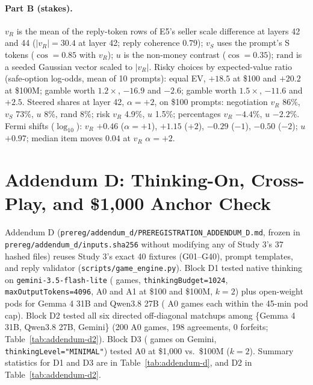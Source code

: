 \paragraph{Part B (stakes).} $v_R$ is the mean of the reply-token rows of E5's seller scale difference at layers 42 and 44 ($|v_R| = 30.4$ at layer 42; reply coherence $0.79$); $v_S$ uses the prompt's S tokens ($\cos = 0.85$ with $v_R$); $u$ is the non-money contrast ($\cos = 0.35$); $\text{rand}$ is a seeded Gaussian vector scaled to $|v_R|$. Risky choices by expected-value ratio (safe-option log-odds, mean of 10 prompts): equal EV, $+18.5$ at \$100 and $+20.2$ at \$100M; gamble worth $1.2\times$, $-16.9$ and $-2.6$; gamble worth $1.5\times$, $-11.6$ and $+2.5$. Steered shares at layer 42, $\alpha = +2$, on \$100 prompts: negotiation $v_R$ 86\%, $v_S$ 73\%, $u$ 8\%, rand 8\%; risk $v_R$ 4.9\%, $u$ 1.5\%; percentages $v_R$ $-4.4\%$, $u$ $-2.2\%$. Fermi shifts ($\log_{10}$): $v_R$ $+0.46$ ($\alpha = +1$), $+1.15$ ($+2$), $-0.29$ ($-1$), $-0.50$ ($-2$); $u$ $+0.97$; median item moves $0.04$ at $v_R$ $\alpha = +2$.



\FloatBarrier
\section{Addendum D: Thinking-On, Cross-Play, and \$1{,}000 Anchor Check}
\label{app:addendum-d}

Addendum D (\texttt{prereg/addendum\_d/PREREGISTRATION\_ADDENDUM\_D.md}, frozen in \texttt{prereg/addendum\_d/inputs.sha256} without modifying any of Study 3's 37 hashed files) reuses Study 3's exact 40 fixtures (G01--G40), prompt templates, and reply validator (\texttt{scripts/game\_engine.py}). Block D1 tested native thinking on \texttt{gemini-3.5-flash-lite} (\addDOneGames{} games, \texttt{thinkingBudget=1024}, \texttt{maxOutputTokens=4096}, A0 and A1 at \$100 and \$100M, $k = 2$) plus open-weight pods for Gemma 4 31B and Qwen3.8 27B (\addDOneGemmaGames{} A0 games each within the 45-min pod cap). Block D2 tested all six directed off-diagonal matchups among \{Gemma 4 31B, Qwen3.8 27B, Gemini\} (200 A0 games, 198 agreements, 0 forfeits; Table~\ref{tab:addendum-d2}). Block D3 (\addDThreeGames{} games on Gemini, \texttt{thinkingLevel="MINIMAL"}) tested A0 at \$1{,}000 vs.\ \$100M ($k = 2$). Summary statistics for D1 and D3 are in Table~\ref{tab:addendum-d}, and D2 in Table~\ref{tab:addendum-d2}.


\FloatBarrier
